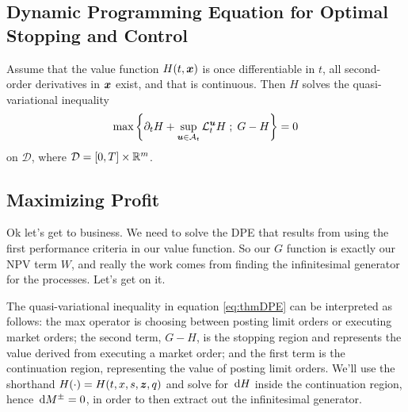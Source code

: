 \subsection{Dynamic Programming Equation for Optimal Stopping and Control}
\begin{theorem}
Assume that the value function $H(t,\bm{x})$ is once differentiable in $t$, all second-order derivatives in $\bm{x}$ exist, and that  is continuous. Then $H$ solves the quasi-variational inequality
\begin{equation}
\label{eq:thmDPE}
\max \left\lbrace \partial_t H + \sup \limits_{\bm{u} \in \mathcal{A}_t} \mathcal{L}^{\bm{u}}_t H \; ; \; G - H \right\rbrace = 0
\end{equation}
on $\mathcal{D}$, where $\mathcal{D} = [0,T] \times \mathbb{R}^m$.
\end{theorem}

\subsection{Maximizing Profit}
Ok let's get to business. We need to solve the DPE that results from using the first performance criteria in our value function. So our $G$ function is exactly our NPV term $W$, and really the work comes from finding the infinitesimal generator for the processes. Let's get on it.

The quasi-variational inequality in equation \ref{eq:thmDPE} can be interpreted as follows: the max operator is choosing between posting limit orders or executing market orders; the second term, $G-H$, is the stopping region and represents the value derived from executing a market order; and the first term is the continuation region, representing the value of posting limit orders. We'll use the shorthand $H(\cdot) = H(t,x,s,\bm{z},q)$ and solve for $\,\mathrm{d} H$ inside the continuation region, hence $\,\mathrm{d} M^{\pm} = 0$, in order to then extract out the infinitesimal generator.

